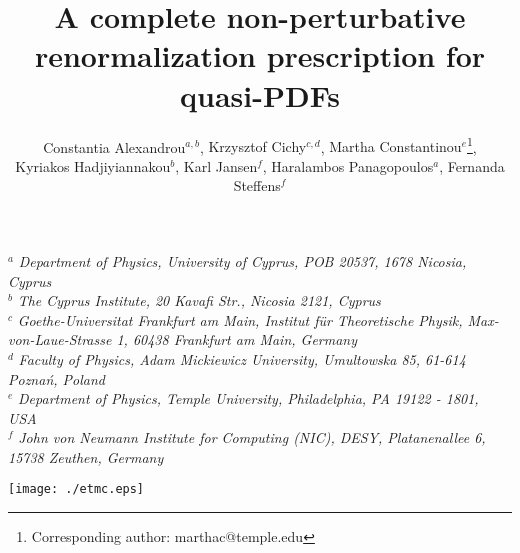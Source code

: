 \documentclass[12pt,tighten,nofootinbib,amssymb,floatfix]{article}
\begin{document}
\parskip=8pt
\enlargethispage{1\baselineskip}


\title{A complete non-perturbative renormalization prescription for quasi-PDFs}

\author{ \normalsize Constantia Alexandrou$^{a,b}$,
{Krzysztof Cichy$^{c,d}$},
{Martha Constantinou$^e$\footnote{Corresponding author: marthac@temple.edu}},\\
\normalsize
{Kyriakos Hadjiyiannakou$^b$},
{Karl Jansen$^f$},
{Haralambos Panagopoulos$^a$},
{Fernanda Steffens$^f$}}

\date{}
\maketitle


\parskip=8pt

\vspace*{-1cm}
\noindent
\begin{center}
$^a$ {\small\it{Department of  Physics,  University  of Cyprus,  POB  20537,  1678  Nicosia,  Cyprus}}\\
$^b$ {\small\it{The Cyprus Institute, 20 Kavafi Str., Nicosia 2121, Cyprus}} \\
$^c$ {\small\it{Goethe-Universitat Frankfurt am Main, Institut f\"ur Theoretische
Physik, Max-von-Laue-Strasse 1, 60438 Frankfurt am Main, Germany}}\\
$^d$ {\small\it{Faculty of Physics, Adam Mickiewicz University, Umultowska 85, 61-614 Pozna\'{n}, Poland}}\\
$^e$ {\small\it{Department of Physics,  Temple University,  Philadelphia,  PA 19122 - 1801,  USA}}\\
$^f$ {\small\it{John von Neumann Institute for Computing (NIC), DESY, Platanenallee 6, 15738 Zeuthen, Germany}}
\end{center}


\begin{center}
\vspace*{1mm}
\texttt{[image: ./etmc.eps]}
\end{center}
\end{document}
